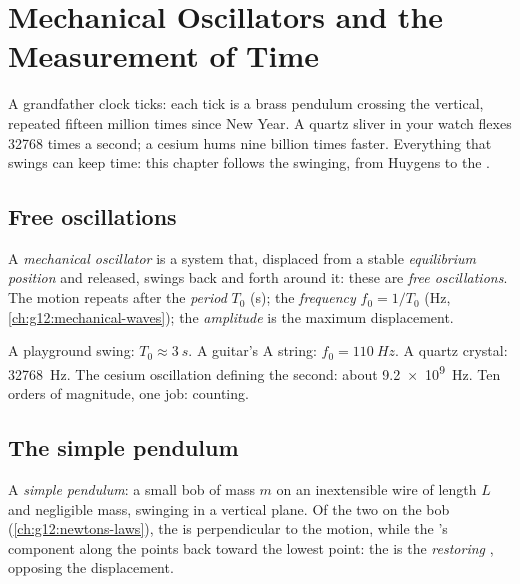 \chapter{Mechanical Oscillators and the Measurement of Time}\label{ch:g12:oscillators-and-time}

A grandfather clock ticks: each tick is a brass pendulum crossing the
vertical, repeated fifteen million times since New Year. A quartz
sliver in your watch flexes \num{32768} times a second; a cesium 
hums nine billion times faster. Everything that swings can keep time:
this chapter follows the swinging, from Huygens to the .

\section{Free oscillations}

\begin{definition}\label{def:g12:oscillators-and-time:oscillator}
A \emph{mechanical oscillator} is a system that,
displaced from a stable \emph{equilibrium position} and released, swings back and forth around it: these are
\emph{free oscillations}. The motion repeats
after the \emph{period} $T_0$ (\unit{s}); the
\emph{frequency} $f_0 = 1/T_0$
(\unit{Hz}, \cref{ch:g12:mechanical-waves}); the
\emph{amplitude} is the maximum displacement.
\end{definition}

\begin{example}\label{ex:g12:oscillators-and-time:zoo}
A playground swing: $T_0 \approx \qty{3}{s}$. A guitar's A string:
$f_0 = \qty{110}{Hz}$. A quartz crystal: \qty{32768}{Hz}. The cesium
oscillation defining the second: about \qty{9.2e9}{Hz}. Ten orders
of magnitude, one job: counting.
\end{example}

\section{The simple pendulum}

\begin{definition}\label{def:g12:oscillators-and-time:pendulum}
A \emph{simple pendulum}: a small bob of mass
$m$ on an inextensible wire of length $L$ and negligible mass,
swinging in a vertical plane. Of the two  on the bob
(\cref{ch:g12:newtons-laws}), the  is perpendicular to the
motion, while the 's component along the  points back
toward the lowest point: the  is the \emph{restoring }%
, opposing the displacement.
\end{definition}

